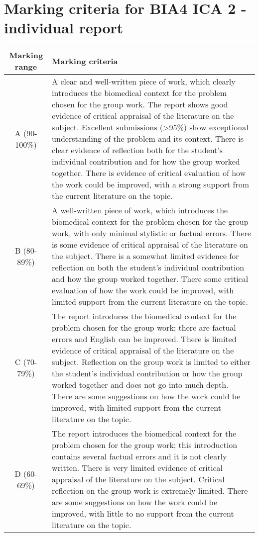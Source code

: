 \documentclass[10pt,a4paper,english]{report}
\begin{document}
\section*{Marking criteria for BIA4 ICA 2 - individual report}

\begin{tabularx}{\textwidth}{|c|X|}
\hline 
\textbf{Marking range} & \textbf{Marking criteria}\\ 
\hline 
A (90-100\%) & A clear and well-written piece of work, which clearly introduces the biomedical context for the problem chosen for the group work. The report shows good evidence of critical appraisal of the literature on the subject. Excellent submissions (>95\%) show exceptional understanding of the problem and its context. There is clear evidence of reflection both for the student's individual contribution and for how the group worked together. There is evidence of critical evaluation of how the work could be improved, with a strong support from the current literature on the topic.\\
\hline 
B (80-89\%) & A well-written piece of work, which introduces the biomedical context for the problem chosen for the group work, with only minimal stylistic or factual errors. There is some evidence of critical appraisal of the literature on the subject. There is a somewhat limited evidence for reflection on both the student's individual contribution and how the group worked together. There some critical evaluation of how the work could be improved, with limited support from the current literature on the topic.\\ 
\hline 
C (70-79\%) &The report introduces the biomedical context for the problem chosen for the group work; there are factual errors and English can be improved. There is limited evidence of critical appraisal of the literature on the subject. Reflection on the group work is limited to either the student's individual contribution or how the group worked together and does not go into much depth.
There are some suggestions on how the work could be improved, with limited support from the current literature on the topic.\\ 
\hline 
D (60-69\%) & The report introduces the biomedical context for the problem chosen for the group work; this introduction contains several factual errors and it is not clearly written. There is very limited evidence of critical appraisal of the literature on the subject. Critical reflection on the group work is extremely limited. There are some suggestions on how the work could be improved, with little to no support from the current literature on the topic.\\ 

\end{tabularx}
\end{document}
